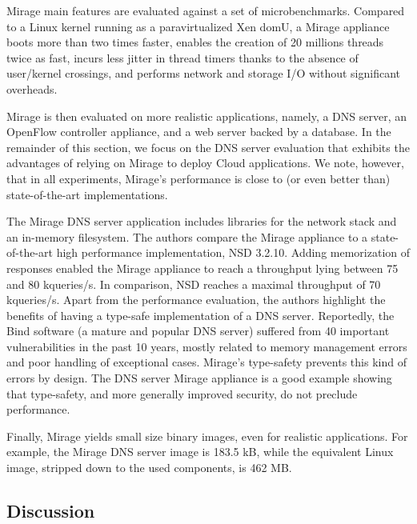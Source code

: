 Mirage main features are evaluated against a set of microbenchmarks.
Compared to a Linux kernel running as a paravirtualized Xen domU, a Mirage appliance boots more than two times faster, enables the creation of 20 millions threads twice as fast, incurs less jitter in thread timers thanks to the absence of user/kernel crossings, and performs network and storage I/O without significant overheads.

Mirage is then evaluated on more realistic applications, namely, a DNS server, an OpenFlow controller appliance, and a web server backed by a database.
In the remainder of this section, we focus on the DNS server evaluation that exhibits the advantages of relying on Mirage to deploy Cloud applications.
We note, however, that in all experiments, Mirage's performance is close to (or even better than) state-of-the-art implementations.

The Mirage DNS server application includes libraries for the network stack and an in-memory filesystem.
The authors compare the Mirage appliance to a state-of-the-art high performance implementation, NSD 3.2.10.
Adding memorization of responses enabled the Mirage appliance to reach a throughput lying between 75 and 80 kqueries/s.
In comparison, NSD reaches a maximal throughput of 70 kqueries/s.
Apart from the performance evaluation, the authors highlight the benefits of having a type-safe implementation of a DNS server.
Reportedly, the Bind software (a mature and popular DNS server) suffered from 40 important vulnerabilities in the past 10 years, mostly related to memory management errors and poor handling of exceptional cases.
Mirage's type-safety prevents this kind of errors by design.
The DNS server Mirage appliance is a good example showing that type-safety, and more generally improved security, do not preclude performance. 

Finally, Mirage yields small size binary images, even for realistic applications.
For example, the Mirage DNS server image is 183.5 kB, while the equivalent Linux image, stripped down to the used components, is 462 MB.


\subsection{Discussion}

